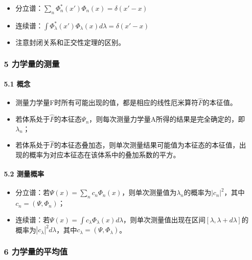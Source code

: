 \documentclass[UTF8,twocolumn]{ctexart}
\providecommand{\tightlist}{%
  \setlength{\itemsep}{0pt}\setlength{\parskip}{0pt}}
\let\oldparagraph\paragraph
\renewcommand{\paragraph}[1]{\oldparagraph{#1}\mbox{}}
\begin{document}
\begin{itemize}
\tightlist
\item
  分立谱：\(\sum_n\Phi_n^*(x')\Phi_n(x)=\delta(x'-x)\)
\item
  连续谱：\(\int\Phi_{\lambda}^*(x')\Phi_{\lambda}(x)d\lambda=\delta(x'-x)\)
\item
  注意封闭关系和正交性定理的区别。
\end{itemize}

\hypertarget{ux529bux5b66ux91cfux7684ux6d4bux91cf}{%
\subsubsection{5
力学量的测量}\label{ux529bux5b66ux91cfux7684ux6d4bux91cf}}

\hypertarget{ux6982ux5ff5-1}{%
\paragraph{ 5.1 概念}\label{ux6982ux5ff5-1}}

\begin{itemize}
\tightlist
\item
  测量力学量F时所有可能出现的值，都是相应的线性厄米算符\(\hat{F}\)的本征值。
\item
  若体系处于\(\hat{F}\)的本征态\(\Psi_n\)，则每次测量力学量A所得的结果是完全确定的，即\(\lambda_n\)；
\item
  若体系处于\(\hat{F}\)的本征态叠加态，则单次测量结果可能值为本征态的本征值，出现的概率为对应本征态在该体系中的叠加系数的平方。
\end{itemize}

\hypertarget{ux6d4bux91cfux6982ux7387}{%
\paragraph{ 5.2 测量概率}\label{ux6d4bux91cfux6982ux7387}}

\begin{itemize}
\tightlist
\item
  分立谱：若\(\Psi(x)=\sum_nc_n\Phi_n(x)\)，则单次测量值为\(\lambda_n\)的概率为\(|c_n|^2\)，其中\(c_n=(\Psi,\Phi_n)\)；
\item
  连续谱：若\(\Psi(x)=\int c_{\lambda}\Phi_{\lambda}(x)d\lambda\)，则单次测量值出现在区间\([\lambda,\lambda+d\lambda]\)的概率为\(|c_{\lambda}|^2d\lambda\)，其中\(c_{\lambda}=(\Psi,\Phi_{\lambda})\)。
\end{itemize}

\hypertarget{ux529bux5b66ux91cfux7684ux5e73ux5747ux503c}{%
\subsubsection{6
力学量的平均值}\label{ux529bux5b66ux91cfux7684ux5e73ux5747ux503c}}
\end{document}
